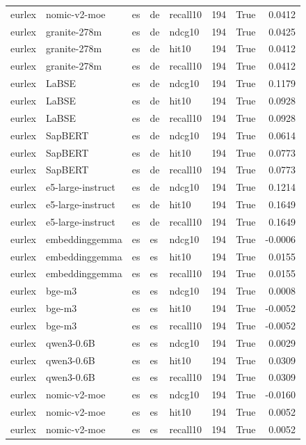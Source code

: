 \begin{tabular}{lllllrrr}
eurlex & nomic-v2-moe & es & de & recall10 & 194 & True & 0.0412 \\
eurlex & granite-278m & es & de & ndcg10 & 194 & True & 0.0425 \\
eurlex & granite-278m & es & de & hit10 & 194 & True & 0.0412 \\
eurlex & granite-278m & es & de & recall10 & 194 & True & 0.0412 \\
eurlex & LaBSE & es & de & ndcg10 & 194 & True & 0.1179 \\
eurlex & LaBSE & es & de & hit10 & 194 & True & 0.0928 \\
eurlex & LaBSE & es & de & recall10 & 194 & True & 0.0928 \\
eurlex & SapBERT & es & de & ndcg10 & 194 & True & 0.0614 \\
eurlex & SapBERT & es & de & hit10 & 194 & True & 0.0773 \\
eurlex & SapBERT & es & de & recall10 & 194 & True & 0.0773 \\
eurlex & e5-large-instruct & es & de & ndcg10 & 194 & True & 0.1214 \\
eurlex & e5-large-instruct & es & de & hit10 & 194 & True & 0.1649 \\
eurlex & e5-large-instruct & es & de & recall10 & 194 & True & 0.1649 \\
eurlex & embeddinggemma & es & es & ndcg10 & 194 & True & -0.0006 \\
eurlex & embeddinggemma & es & es & hit10 & 194 & True & 0.0155 \\
eurlex & embeddinggemma & es & es & recall10 & 194 & True & 0.0155 \\
eurlex & bge-m3 & es & es & ndcg10 & 194 & True & 0.0008 \\
eurlex & bge-m3 & es & es & hit10 & 194 & True & -0.0052 \\
eurlex & bge-m3 & es & es & recall10 & 194 & True & -0.0052 \\
eurlex & qwen3-0.6B & es & es & ndcg10 & 194 & True & 0.0029 \\
eurlex & qwen3-0.6B & es & es & hit10 & 194 & True & 0.0309 \\
eurlex & qwen3-0.6B & es & es & recall10 & 194 & True & 0.0309 \\
eurlex & nomic-v2-moe & es & es & ndcg10 & 194 & True & -0.0160 \\
eurlex & nomic-v2-moe & es & es & hit10 & 194 & True & 0.0052 \\
eurlex & nomic-v2-moe & es & es & recall10 & 194 & True & 0.0052 \\

\end{tabular}
